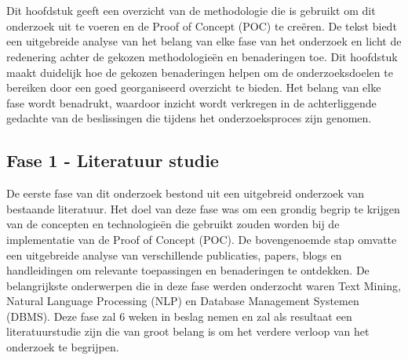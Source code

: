 
\chapter{}%
\label{ch:methodologie}


Dit hoofdstuk geeft een overzicht van de methodologie die is gebruikt om dit onderzoek uit te voeren en de Proof of Concept (POC) te creëren. De tekst biedt een uitgebreide analyse van het belang van elke fase van het onderzoek en licht de redenering achter de gekozen methodologieën en benaderingen toe. Dit hoofdstuk maakt duidelijk hoe de gekozen benaderingen helpen om de onderzoeksdoelen te bereiken door een goed georganiseerd overzicht te bieden. Het belang van elke fase wordt benadrukt, waardoor inzicht wordt verkregen in de achterliggende gedachte van de beslissingen die tijdens het onderzoeksproces zijn genomen.

\section{Fase 1 - Literatuur studie}
De eerste fase van dit onderzoek bestond uit een uitgebreid onderzoek van bestaande literatuur. Het doel van deze fase was om een grondig begrip te krijgen van de concepten en technologieën die gebruikt zouden worden bij de implementatie van de Proof of Concept (POC). De bovengenoemde stap omvatte een uitgebreide analyse van verschillende publicaties, papers, blogs en handleidingen om relevante toepassingen en benaderingen te ontdekken. De belangrijkste onderwerpen die in deze fase werden onderzocht waren Text Mining, Natural Language Processing (NLP) en Database Management Systemen (DBMS). Deze fase zal
6 weken in beslag nemen en zal als resultaat een literatuurstudie zijn die van groot belang is om het verdere verloop van het onderzoek te begrijpen.
